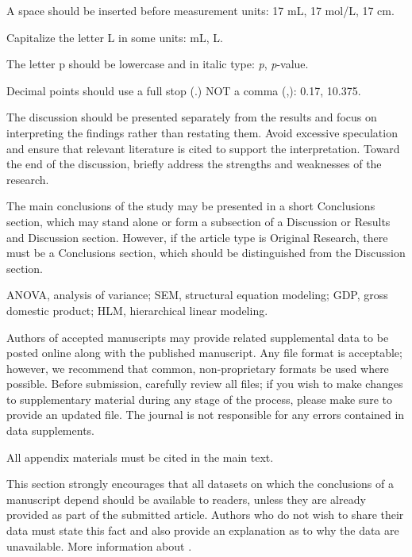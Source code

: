 \documentclass{ko-template}
\begin{document}
\begin{KOItemize}
\item A space should be inserted before measurement units: 17 mL, 17 mol/L, 17 cm.
\item Capitalize the letter L in some units: mL, L.
\item The letter p should be lowercase and in italic type: \textit{p}, \textit{p}-value.
\item Decimal points should use a full stop (.) NOT a comma (,): 0.17, 10.375.
\end{KOItemize}

The discussion should be presented separately from the results and focus on interpreting the findings rather than restating them. Avoid excessive speculation and ensure that relevant literature is cited to support the interpretation. Toward the end of the discussion, briefly address the strengths and weaknesses of the research.

The main conclusions of the study may be presented in a short Conclusions section, which may stand alone or form a subsection of a Discussion or Results and Discussion section. However, if the article type is Original Research, there must be a Conclusions section, which should be distinguished from the Discussion section.

ANOVA, analysis of variance; SEM, structural equation modeling; GDP, gross domestic product; HLM, hierarchical linear modeling.

Authors of accepted manuscripts may provide related supplemental data to be posted online along with the published manuscript. Any file format is acceptable; however, we recommend that common, non-proprietary formats be used where possible. Before submission, carefully review all files; if you wish to make changes to supplementary material during any stage of the process, please make sure to provide an updated file. The journal is not responsible for any errors contained in data supplements.

All appendix materials must be cited in the main text.

This section strongly encourages that all datasets on which the conclusions of a manuscript depend should be available to readers, unless they are already provided as part of the submitted article. Authors who do not wish to share their data must state this fact and also provide an explanation as to why the data are unavailable. More information about .
\end{document}
